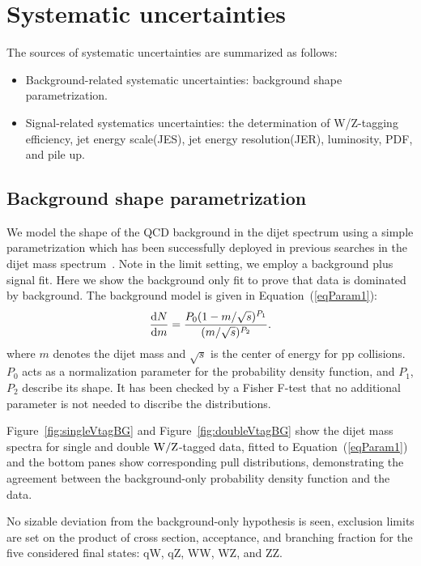 \section{Systematic uncertainties}
\label{sec:systematics1}
The sources of systematic uncertainties are summarized as
follows:
\begin{itemize}
\item Background-related systematic uncertainties: background shape parametrization.
\item Signal-related systematics uncertainties: the determination of W/Z-tagging efficiency, jet energy scale(JES), jet energy resolution(JER), luminosity, PDF, and pile up.
\end{itemize}

\subsection{Background shape parametrization}
\label{sec:background1}

We model the shape of the QCD background in the dijet spectrum 
using a simple parametrization which has been successfully deployed in
previous searches in the dijet mass spectrum~\cite{cmsdijet}.
Note in the limit setting, we employ a background plus signal fit. Here
we show the background only fit to prove that data is dominated by background. 
The background model is given in Equation~(\ref{eqParam1}):
\begin{equation}
\frac{{\rm d}N}{{\rm d}m} = 
\frac{P_{0} (1 - m/\sqrt{s})^{P_{1}}}{(m/\sqrt{s})^{P_{2}
}} .
\label{eqParam1}
\end{equation}
\noindent where $m$ denotes the dijet mass and $\sqrt{s}$  is the center of energy for pp collisions.
$P_0$ acts as a normalization parameter for the probability
density function, and $P_1$, $P_2$ describe its shape.
It has been checked by a Fisher F-test that no additional parameter is not needed to discribe the distributions.

Figure~\ref{fig:singleVtagBG} and Figure~\ref{fig:doubleVtagBG} show the dijet mass spectra for
single and double ${\rm W}/{\rm Z}$-tagged data, fitted to Equation~(\ref{eqParam1}) and the bottom panes show corresponding pull
distributions, demonstrating the agreement between the background-only
probability density function and the data.

No sizable deviation from the background-only hypothesis is seen,
exclusion limits are set on the product of cross section, acceptance, and branching fraction for
the five considered final states: qW, qZ, WW, WZ, and ZZ.

